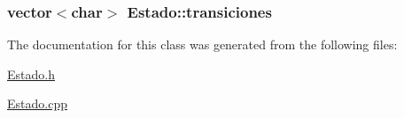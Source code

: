 \subsubsection[{\texorpdfstring{transiciones}{transiciones}}]{\setlength{\rightskip}{0pt plus 5cm}vector$<$char$>$ Estado\+::transiciones\hspace{0.3cm}{\ttfamily [private]}}\hypertarget{classEstado_a207caa56f6fea708339cf115f34cfed5}{}\label{classEstado_a207caa56f6fea708339cf115f34cfed5}


The documentation for this class was generated from the following files\+:\begin{DoxyCompactItemize}
\item 
\hyperlink{Estado_8h}{Estado.\+h}\item 
\hyperlink{Estado_8cpp}{Estado.\+cpp}\end{DoxyCompactItemize}
